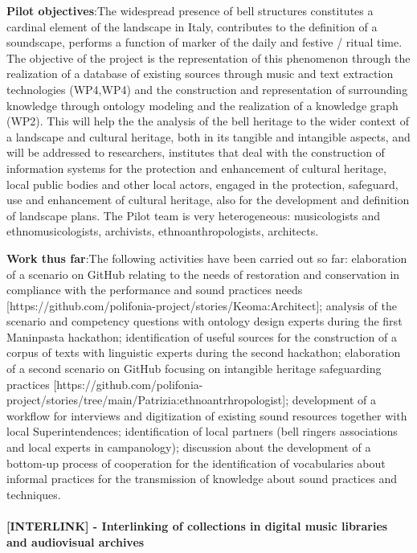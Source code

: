 \textbf{Pilot objectives}:The widespread presence of bell structures  constitutes a cardinal element of the landscape in Italy, contributes to the definition of a soundscape,  performs a function of marker of the daily and festive / ritual time. The objective of the project is the representation of this  phenomenon through the realization of a database of existing sources through music and text extraction technologies (WP4,WP4) and  the construction and representation of surrounding knowledge  through ontology modeling and the realization of a knowledge graph (WP2). This will help the the analysis of the bell heritage to the wider context of a landscape and cultural heritage, both in its tangible and intangible aspects, and will be addressed to researchers, institutes that deal with the construction of information systems for the protection and enhancement of cultural heritage, local public bodies and other local actors, engaged in the protection, safeguard, use and enhancement of cultural heritage, also for the development and definition of landscape plans. The Pilot team is very heterogeneous: musicologists and ethnomusicologists, archivists, ethnoanthropologists, architects.

\textbf{Work thus far}:The following activities have been carried out so far: elaboration of a scenario on GitHub relating to the needs of restoration and conservation in compliance with the performance and sound practices needs [https://github.com/polifonia-project/stories/Keoma:Architect]; analysis of the scenario and competency questions with ontology design experts during the first Maninpasta hackathon; identification of useful sources for the construction of a corpus of texts with linguistic experts during the second hackathon; elaboration of a second scenario on GitHub focusing on intangible heritage safeguarding practices [https://github.com/polifonia-project/stories/tree/main/Patrizia:ethnoantrhropologist]; development of a workflow for interviews and digitization of existing sound resources together with local Superintendences; identification of local partners (bell ringers associations and local experts in campanology); discussion about the  development of a bottom-up process of cooperation for the identification of vocabularies about  informal practices for the transmission of knowledge about sound practices and techniques.

\paragraph*{[INTERLINK] - Interlinking of collections in digital music libraries and audiovisual archives}\label{sec:pilot:interlink}

